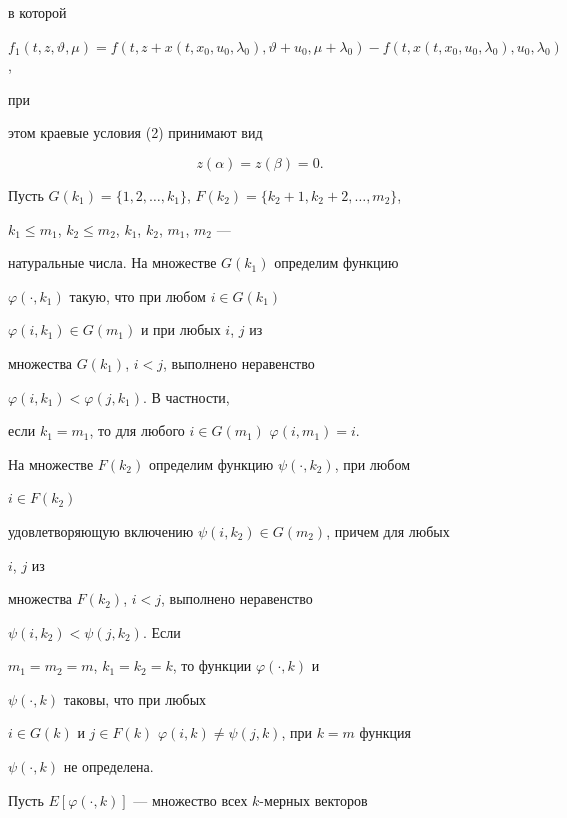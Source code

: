 в которой 


$f_1(t,z,\vartheta,\mu)=f(t,z+x(t,x_0,u_0,\lambda_0), 


\vartheta+u_0,\mu+\lambda_0)-f(t,x(t,x_0,u_0,\lambda_0),u_0,\lambda_0)$, 


при 


этом краевые условия (2) принимают вид 


\begin{equation} 


z(\alpha)=z(\beta)=0. 


\end{equation} 


 


Пусть $G(k_1)=\{1,2,\dotsc,k_1\}$, $F(k_2)=\{k_2+1,k_2+2,\dotsc,m_2\}$, 


$k_1\le m_1$, $k_2\le m_2$, $k_1$, $k_2$, $m_1$, $m_2$ --- 


натуральные числа. На множестве $G(k_1)$ определим функцию 


$\varphi(\cdot,k_1)$ такую, что при любом $i\in G(k_1)$\; 


$\varphi(i,k_1)\in G(m_1)$ и при любых $i$, $j$ из 


множества $G(k_1)$, $i<j$, выполнено неравенство 


$\varphi(i,k_1)<\varphi(j,k_1)$. В частности, 


если $k_1=m_1$, то для любого $i\in G(m_1)$\; $\varphi(i,m_1)=i$. 


На множестве $F(k_2)$ определим функцию $\psi(\cdot,k_2)$, при любом 


$i\in F(k_2)$ 


удовлетворяющую включению $\psi(i,k_2)\in G(m_2)$, причем для любых 


$i$, $j$ из 


множества $F(k_2)$, $i<j$, выполнено неравенство 


$\psi(i,k_2)<\psi(j,k_2)$. Если 


$m_1=m_2=m$, $k_1=k_2=k$, то функции $\varphi(\cdot,k)$ и 


$\psi(\cdot,k)$ таковы, что при любых 


$i\in G(k)$ и $j\in F(k)$\; $\varphi(i,k)\ne\psi(j,k)$, при $k=m$ функция 


$\psi(\cdot,k)$ не определена. 


 


Пусть $E[\varphi(\cdot,k)]$ --- множество всех $k$-мерных векторов 


